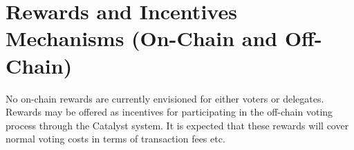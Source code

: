 \section{Rewards and Incentives Mechanisms (On-Chain and Off-Chain)}
\label{sect:rewards}

No on-chain rewards are currently envisioned for either voters or delegates.   Rewards may be offered as incentives for participating in the off-chain voting process through
the Catalyst system.  It is expected that these rewards will cover normal voting costs in terms of transaction fees etc.
